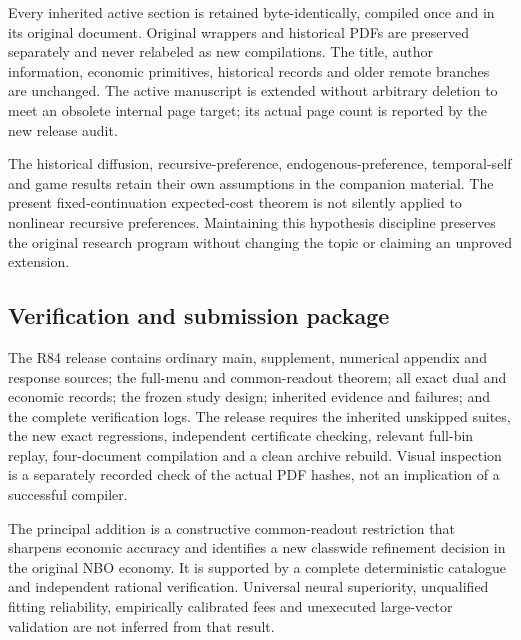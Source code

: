 Every inherited active section is retained byte-identically, compiled
once and in its original document. Original wrappers and historical PDFs
are preserved separately and never relabeled as new compilations. The
title, author information, economic primitives, historical records and
older remote branches are unchanged. The active manuscript is extended
without arbitrary deletion to meet an obsolete internal page target; its
actual page count is reported by the new release audit.

The historical diffusion, recursive-preference, endogenous-preference,
temporal-self and game results retain their own assumptions in the
companion material. The present fixed-continuation expected-cost theorem
is not silently applied to nonlinear recursive preferences. Maintaining
this hypothesis discipline preserves the original research program
without changing the topic or claiming an unproved extension.

\hypertarget{verification-and-submission-package}{%
\subsection{Verification and submission
package}\label{verification-and-submission-package}}

The R84 release contains ordinary main, supplement, numerical appendix
and response sources; the full-menu and common-readout theorem; all
exact dual and economic records; the frozen study design; inherited
evidence and failures; and the complete verification logs. The release
requires the inherited unskipped suites, the new exact regressions,
independent certificate checking, relevant full-bin replay,
four-document compilation and a clean archive rebuild. Visual inspection
is a separately recorded check of the actual PDF hashes, not an
implication of a successful compiler.

The principal addition is a constructive common-readout restriction that
sharpens economic accuracy and identifies a new classwide refinement
decision in the original NBO economy. It is supported by a complete
deterministic catalogue and independent rational verification. Universal
neural superiority, unqualified fitting reliability, empirically
calibrated fees and unexecuted large-vector validation are not inferred
from that result.
